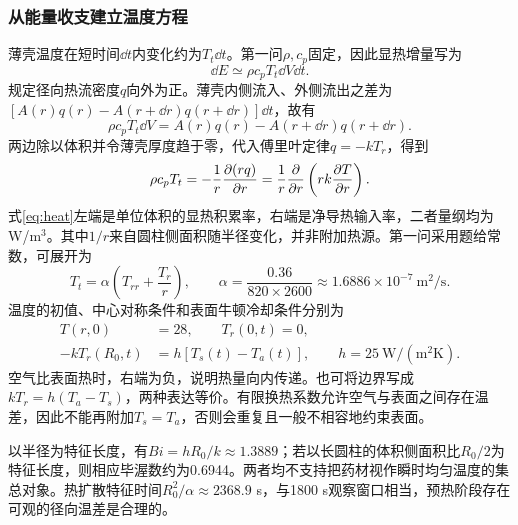 \subsubsection{从能量收支建立温度方程}
薄壳温度在短时间$\dd t$内变化约为$T_t\dd t$。第一问$\rho,c_p$固定，因此显热增量写为
\begin{equation}
\dd E\simeq \rho c_pT_t\dd V\dd t .
\end{equation}
规定径向热流密度$q$向外为正。薄壳内侧流入、外侧流出之差为$[A(r)q(r)-A(r+\dd r)q(r+\dd r)]\dd t$，故有
\begin{equation}
\rho c_pT_t\dd V=A(r)q(r)-A(r+\dd r)q(r+\dd r).
\end{equation}
两边除以体积并令薄壳厚度趋于零，代入傅里叶定律$q=-kT_r$，得到
\begin{equation}
\rho c_pT_t=-\frac1r\frac{\partial(rq)}{\partial r}
=\frac1r\frac{\partial}{\partial r}\left(rk\frac{\partial T}{\partial r}\right).
\label{eq:heat}
\end{equation}
式\eqref{eq:heat}左端是单位体积的显热积累率，右端是净导热输入率，二者量纲均为W/m$^3$。其中$1/r$来自圆柱侧面积随半径变化，并非附加热源。第一问采用题给常数，可展开为
\begin{equation}
T_t=\alpha\left(T_{rr}+\frac{T_r}{r}\right),\qquad
\alpha=\frac{0.36}{820\times2600}
\approx1.6886\times10^{-7}\ \mathrm{m^2/s}.
\label{eq:linearheat}
\end{equation}
温度的初值、中心对称条件和表面牛顿冷却条件分别为
\begin{align}
T(r,0)&=28,\qquad T_r(0,t)=0,\\
-kT_r(R_0,t)&=h[T_s(t)-T_a(t)],\qquad h=25\ \mathrm{W/(m^2K)}.
\label{eq:heatbc}
\end{align}
空气比表面热时，右端为负，说明热量向内传递。也可将边界写成$kT_r=h(T_a-T_s)$，两种表达等价。有限换热系数允许空气与表面之间存在温差，因此不能再附加$T_s=T_a$，否则会重复且一般不相容地约束表面。

以半径为特征长度，有$Bi=hR_0/k\approx1.3889$；若以长圆柱的体积侧面积比$R_0/2$为特征长度，则相应毕渥数约为0.6944。两者均不支持把药材视作瞬时均匀温度的集总对象。热扩散特征时间$R_0^2/\alpha\approx2368.9$ s，与1800 s观察窗口相当，预热阶段存在可观的径向温差是合理的。


\nextpage

